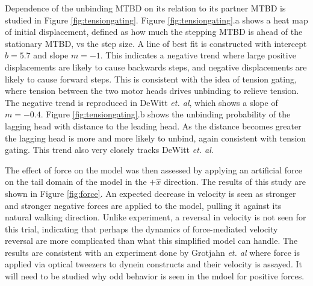 \documentclass[9pt,twocolumn,twoside]{article}
\begin{document}
Dependence of the unbinding MTBD on its relation to its partner MTBD is studied in Figure \ref{fig:tensiongating}. Figure \ref{fig:tensiongating}.a shows a heat map of initial displacement, defined as how much the stepping MTBD is ahead of the stationary MTBD, vs the step size. A line of best fit is constructed with intercept $b=5.7$ and slope $m=-1$. This indicates a negative trend where large positive displacements are likely to cause backwards steps, and negative displacements are likely to cause forward steps. This is consistent with the idea of tension gating, where tension between the two motor heads drives unbinding to relieve tension. The negative trend is reproduced in DeWitt \textit{et. al}, which shows a slope of $m=-0.4$. Figure \ref{fig:tensiongating}.b shows the unbinding probability of the lagging head with distance to the leading head. As the distance becomes greater the lagging head is more and more likely to unbind, again consistent with tension gating. This trend also very closely tracks DeWitt \textit{et. al}.


The effect of force on the model was then assessed by applying an artificial force on the tail domain of the model in the $+\hat{x}$ direction. The results of this study are shown in Figure \ref{fig:force}. An expected decrease in velocity is seen as stronger and stronger negative forces are applied to the model, pulling it against its natural walking direction. Unlike experiment, a reversal in velocity is not seen for this trial, indicating that perhaps the dynamics of force-mediated velocity reversal are more complicated than what this simplified model can handle. The results are consistent with an experiment done by Grotjahn \textit{et. al} where force is applied via optical tweezers to dynein constructs and their velocity is assayed. It will need to be studied why odd behavior is seen in the mdoel for positive forces.
\end{document}
